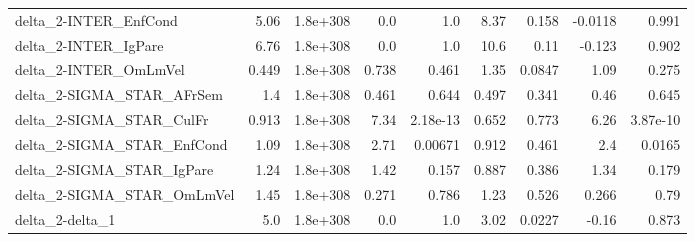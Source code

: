 \begin{tabular}{lrrrrrrrr}
delta\_2-INTER\_EnfCond                 &        5.06 &     1.8e+308 &      0.0 &      1.0 &       8.37 &       0.158 &      -0.0118 &         0.991 \\
delta\_2-INTER\_IgPare                  &        6.76 &     1.8e+308 &      0.0 &      1.0 &       10.6 &        0.11 &       -0.123 &         0.902 \\
delta\_2-INTER\_OmLmVel                 &       0.449 &     1.8e+308 &    0.738 &    0.461 &       1.35 &      0.0847 &         1.09 &         0.275 \\
delta\_2-SIGMA\_STAR\_AFrSem             &         1.4 &     1.8e+308 &    0.461 &    0.644 &      0.497 &       0.341 &         0.46 &         0.645 \\
delta\_2-SIGMA\_STAR\_CulFr              &       0.913 &     1.8e+308 &     7.34 & 2.18e-13 &      0.652 &       0.773 &         6.26 &      3.87e-10 \\
delta\_2-SIGMA\_STAR\_EnfCond            &        1.09 &     1.8e+308 &     2.71 &  0.00671 &      0.912 &       0.461 &          2.4 &        0.0165 \\
delta\_2-SIGMA\_STAR\_IgPare             &        1.24 &     1.8e+308 &     1.42 &    0.157 &      0.887 &       0.386 &         1.34 &         0.179 \\
delta\_2-SIGMA\_STAR\_OmLmVel            &        1.45 &     1.8e+308 &    0.271 &    0.786 &       1.23 &       0.526 &        0.266 &          0.79 \\
delta\_2-delta\_1                       &         5.0 &     1.8e+308 &      0.0 &      1.0 &       3.02 &      0.0227 &        -0.16 &         0.873 \\
\bottomrule
\end{tabular}
